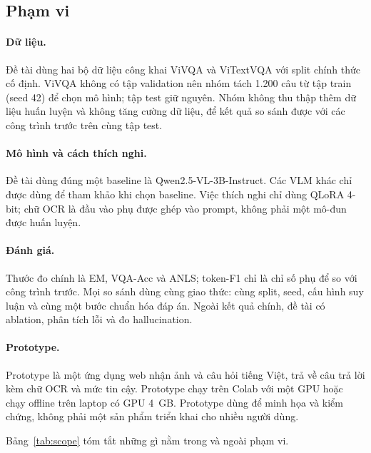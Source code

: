 \subsection{Phạm vi}

\paragraph{Dữ liệu.} Đề tài dùng hai bộ dữ liệu công khai ViVQA và ViTextVQA với
split chính thức cố định. ViVQA không có tập validation nên nhóm tách 1.200 câu
từ tập train (seed 42) để chọn mô hình; tập test giữ nguyên. Nhóm không thu thập
thêm dữ liệu huấn luyện và không tăng cường dữ liệu, để kết quả so sánh được với
các công trình trước trên cùng tập test.

\paragraph{Mô hình và cách thích nghi.} Đề tài dùng đúng một baseline là
Qwen2.5-VL-3B-Instruct. Các VLM khác chỉ được dùng để tham khảo khi chọn
baseline. Việc thích nghi chỉ dùng QLoRA 4-bit; chữ OCR là đầu vào phụ được ghép
vào prompt, không phải một mô-đun được huấn luyện.

\paragraph{Đánh giá.} Thước đo chính là EM, VQA-Acc và ANLS; token-F1 chỉ là chỉ
số phụ để so với công trình trước. Mọi so sánh dùng cùng giao thức: cùng split,
seed, cấu hình suy luận và cùng một bước chuẩn hóa đáp án. Ngoài kết quả chính,
đề tài có ablation, phân tích lỗi và đo hallucination.

\paragraph{Prototype.} Prototype là một ứng dụng web nhận ảnh và câu hỏi tiếng
Việt, trả về câu trả lời kèm chữ OCR và mức tin cậy. Prototype chạy trên Colab với
một GPU hoặc chạy offline trên laptop có GPU 4~GB. Prototype dùng để minh họa và kiểm chứng, không phải một sản phẩm triển khai
cho nhiều người dùng.

Bảng~\ref{tab:scope} tóm tắt những gì nằm trong và ngoài phạm vi.

